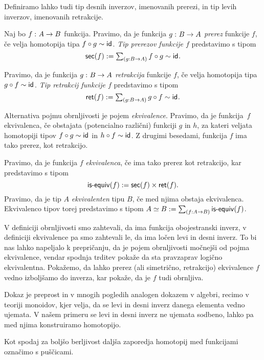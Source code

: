 Definiramo lahko tudi tip desnih inverzov, imenovanih prerezi, in tip levih inverzov, imenovanih retrakcije.
\begin{definicija}
  Naj bo \(f \,\colon A \to B\) funkcija.
    Pravimo, da je funkcija \(g \,\colon B \to A\) \emph{prerez} funkcije \(f\), če velja homotopija tipa \(f \circ g \sim \textnormal{\textsf{id}}_{}\).
  \emph{Tip prerezov funkcije \(f\)} predstavimo s tipom
  \[\textnormal{\textsf{sec}}(f) := \textstyle \sum_{\left( {g : B \to A} \right)} f \circ g \sim \textnormal{\textsf{id}}_{}.\]

  Pravimo, da je funkcija \(g \,\colon B \to A\) \emph{retrakcija} funkcije \(f\), če velja homotopija tipa \(g \circ f \sim \textnormal{\textsf{id}}_{}\).
  \emph{Tip retrakcij funkcije \(f\)} predstavimo s tipom
  \[\textnormal{\textsf{ret}}(f) := \textstyle \sum_{\left( {g : B \to A} \right)} g \circ f \sim \textnormal{\textsf{id}}_{}.\]
\end{definicija}

Alternativa pojmu obrnljivosti je pojem \emph{ekvivalence}. Pravimo, da je funkcija~\(f\) ekvivalenca, če obstajata (potencialno različni) funkciji \(g\) in \(h\), za kateri veljata homotopiji tipov \(f \circ g \sim \textnormal{\textsf{id}}_{}\) in \(h \circ f \sim \textnormal{\textsf{id}}_{}\). Z drugimi besedami, funkcija \(f\) ima tako prerez, kot retrakcijo.

\begin{definicija}
  Pravimo, da je funkcija \(f\) \emph{ekvivalenca}, če ima tako prerez kot retrakcijo,
  kar predstavimo s tipom \[\textnormal{\textsf{is-equiv}}(f) := \textnormal{\textsf{sec}}(f) \times \textnormal{\textsf{ret}}(f).\]
  Pravimo, da je tip \(A\) \emph{ekvivalenten} tipu \(B\), če  med njima obstaja ekvivalenca. Ekvivalenco tipov torej predstavimo s tipom \(A \simeq B := \textstyle \sum_{\left( {f : A \to B} \right)} \textnormal{\textsf{is-equiv}}(f)\).
\end{definicija}

V definiciji obrnljivosti smo zahtevali, da ima funkcija obojestranski inverz, v
definiciji ekvivalence pa smo zahtevali le, da ima ločen levi in desni inverz.
To bi nas lahko napeljalo k prepričanju, da je pojem obrnljivosti močnejši od pojma ekvivalence, vendar spodnja trditev pokaže da sta pravzaprav logično ekvivalentna. Pokažemo, da lahko prerez (ali simetrično, retrakcijo) ekvivalence \(f\) vedno izboljšamo do inverza, kar pokaže, da je \(f\) tudi obrnljiva.

Dokaz je preprost in v mnogih pogledih analogen dokazem v algebri, recimo v teoriji monoidov, kjer velja, da se levi in desni inverz danega elementa vedno ujemata. V našem primeru se levi in desni inverz ne ujemata sodbeno, lahko pa med njima konstruiramo homotopijo.

Kot spodaj za boljšo berljivost daljša zaporedja homotopij med funkcijami označimo s puščicami.

